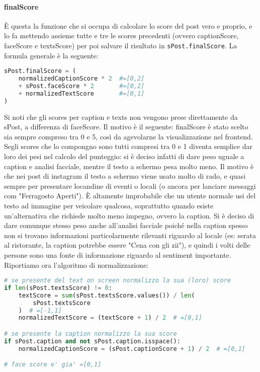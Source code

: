 \paragraph{finalScore}
È questa la funzione che si occupa di calcolare lo score del post vero e proprio, e lo fa
mettendo assieme tutte e tre le scores precedenti (ovvero captionScore, faceScore e textsScore)
per poi salvare il risultato in \verb+sPost.finalScore+.
La formula generale è la seguente:
\begin{lstlisting}[language=Python]
sPost.finalScore = (
    normalizedCaptionScore * 2  #=[0,2]
    + sPost.faceScore * 2       #=[0,2]
    + normalizedTextScore       #=[0,1]
)
\end{lstlisting}
Si noti che gli scores per caption e texts non vengono prese direttamente da sPost, a differenza
di faceScore. 
Il motivo è il seguente: finalScore è stato scelto sia sempre compreso tra 0 e 5,
così da agevolarne la visualizzazione nel frontend. Segli scores che lo compongno sono tutti
compresi tra 0 e 1 diventa semplice dar loro dei pesi nel calcolo del punteggio: si è deciso
infatti di dare peso uguale a caption e analisi facciale, mentre il testo a schermo pesa molto meno.
Il motivo è che nei post di instagram il testo a schermo viene usato molto di rado, e quasi sempre
per presentare locandine di eventi o locali (o ancora per lanciare messaggi com "Ferragosto Aperti").
È altamente improbabile che un utente normale usi del testo ad immagine per veicolare qualcosa,
soprattutto quando esiste un'alternativa che richiede molto meno impegno, ovvero la caption.
Si è deciso di dare comunque stesso peso anche all'analisi facciale poiché nella caption spesso
non si trovano informazioni particolarmente rilevanti riguardo al locale (es: serata al ristorante,
la caption potrebbe essere "Cena con gli zii"), e quindi i volti delle persone sono una fonte di
informazione riguardo al sentiment importante.
Riportiamo ora l'algoritmo di normalizzazione:
\begin{lstlisting}[language=Python]
# se presente del text on screen normalizzo la sua (loro) score
if len(sPost.textsScore) != 0:
    textScore = sum(sPost.textsScore.values()) / len(
        sPost.textsScore
    )  # =[-1,1]
    normalizedTextScore = (textScore + 1) / 2  # =[0,1]

# se presente la caption normalizzo la sua score
if sPost.caption and not sPost.caption.isspace():
    normalizedCaptionScore = (sPost.captionScore + 1) / 2  # =[0,1]

# face score e' gia' =[0,1]
\end{lstlisting}
